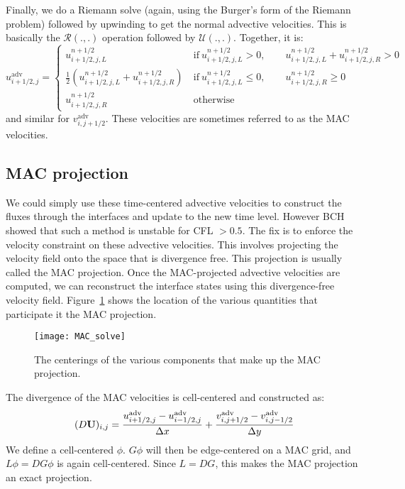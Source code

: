 Finally, we do a Riemann solve (again, using the Burger's form of the
Riemann problem) followed by upwinding to get the normal advective
velocities.  This is basically the $\mathcal{R}(.,.)$ operation followed 
by $\mathcal{U}(.,.)$.  Together, it is:
\begin{equation}
u^\mathrm{adv}_{i+1/2,j} = \left \{ \begin{array}{cl}
   u_{i+1/2,j,L}^{n+1/2}  & 
         \mathrm{~if~} u_{i+1/2,j,L}^{n+1/2} > 0, \qquad 
                       u_{i+1/2,j,L}^{n+1/2} + u_{i+1/2,j,R}^{n+1/2} > 0 \\
   \frac{1}{2} \left ( u_{i+1/2,j,L}^{n+1/2} +
                       u_{i+1/2,j,R}^{n+1/2} \right )  &
          \mathrm{~if~} u_{i+1/2,j,L}^{n+1/2} \le 0, \qquad 
                        u_{i+1/2,j,R}^{n+1/2} \ge 0 \\
   u_{i+1/2,j,R}^{n+1/2}  & \mathrm{~otherwise}
  \end{array}
  \right .
\end{equation}
and similar for $v^\mathrm{adv}_{i,j+1/2}$.  
These velocities are sometimes referred to as the MAC velocities.


\subsection{MAC projection}

We could simply use these time-centered advective velocities to
construct the fluxes through the interfaces and update to the new time
level.  However BCH showed that such a method is unstable for CFL $>
0.5$.  The fix is to enforce the velocity constraint on these advective
velocities.  This involves projecting the velocity field onto the
space that is divergence free.  This projection is usually called the
MAC projection.  Once the MAC-projected advective velocities are
computed, we can reconstruct the interface states using this
divergence-free velocity field.  Figure~\ref{fig:incomp:MACsolve}
shows the location of the various quantities that participate
it the MAC projection.

\begin{figure}[t]
\centering
\texttt{[image: MAC\_solve]}
\caption[MAC grid data centerings] {\label{fig:incomp:MACsolve} The
  centerings of the various components that make up the MAC
  projection.}
\end{figure}

The divergence of the MAC velocities is cell-centered and constructed as:
\begin{equation}
(D {\bf U})_{i,j} = \frac{u^\mathrm{adv}_{i+1/2,j} - u^\mathrm{adv}_{i-1/2,j}}
                   {\Delta x} +
              \frac{v^\mathrm{adv}_{i,j+1/2} - v^\mathrm{adv}_{i,j-1/2}}
                   {\Delta y}
\end{equation}
We define a cell-centered $\phi$.  $G\phi$ will then be edge-centered
on a MAC grid, and $L\phi = DG\phi$ is again cell-centered.  Since $L =
DG$, this makes the MAC projection an exact projection.

